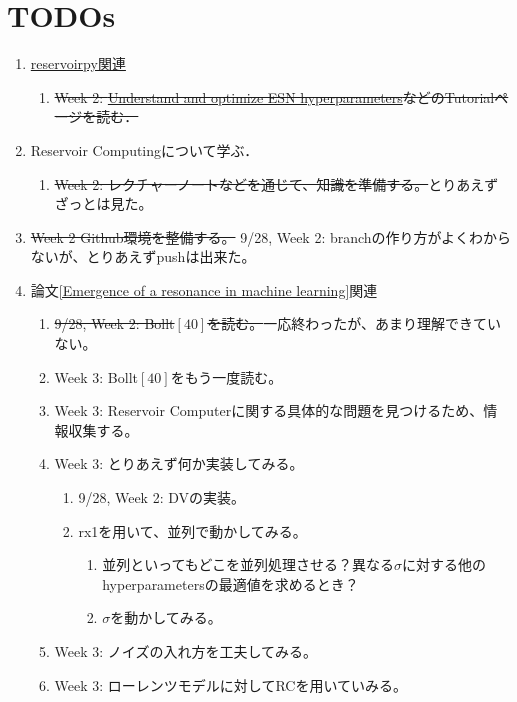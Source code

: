 \section{TODOs}
\begin{enumerate}
  \item \href{https://github.com/reservoirpy/reservoirpy}{reservoirpy関連}
  \begin{enumerate}
  \item \sout{Week 2: \href{https://github.com/reservoirpy/reservoirpy/blob/master/tutorials/4-Understand_and_optimize_hyperparameters.ipynb}{Understand and optimize ESN hyperparameters}などのTutorialページを読む．}
  \end{enumerate}
  \item Reservoir Computingについて学ぶ．\begin{enumerate}
    \item \sout{Week 2: レクチャーノートなどを通じて、知識を準備する。}とりあえずざっとは見た。
  \end{enumerate}
  \item \sout{Week 2 Github環境を整備する。} 9/28, Week 2: branchの作り方がよくわからないが、とりあえずpushは出来た。
  \item 論文\ref{Emergence of a resonance in machine learning}関連
    \begin{enumerate}
    \item \sout{9/28, Week 2: Bollt$[40]$を読む。}一応終わったが、あまり理解できていない。
    \item Week 3: Bollt$[40]$をもう一度読む。
    \item Week 3: Reservoir Computerに関する具体的な問題を見つけるため、情報収集する。
    \item Week 3: とりあえず何か実装してみる。\begin{enumerate}
      \item 9/28, Week 2: DVの実装。
      \item rx1を用いて、並列で動かしてみる。\begin{enumerate}
        \item 並列といってもどこを並列処理させる？異なる$\sigma$に対する他のhyperparametersの最適値を求めるとき？
        \item $\sigma$を動かしてみる。
      \end{enumerate}
    \end{enumerate}
    \item Week 3: ノイズの入れ方を工夫してみる。
    \item Week 3: ローレンツモデルに対してRCを用いていみる。

\end{enumerate}
\end{enumerate}
